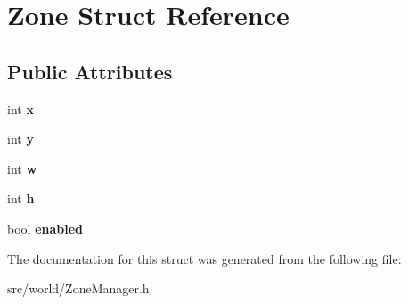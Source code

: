 \hypertarget{structZone}{\section{Zone Struct Reference}
\label{structZone}
}
\subsection*{Public Attributes}
\begin{DoxyCompactItemize}
\item 
\hypertarget{structZone_a439327647492fa561be6d47ab3d40bec}{int {\bfseries x}}\label{structZone_a439327647492fa561be6d47ab3d40bec}

\item 
\hypertarget{structZone_a1a0acf355558e1188d459e66bd6e317d}{int {\bfseries y}}\label{structZone_a1a0acf355558e1188d459e66bd6e317d}

\item 
\hypertarget{structZone_a0cbeccc4a1342d8d3c7ea1bb76fbdc7a}{int {\bfseries w}}\label{structZone_a0cbeccc4a1342d8d3c7ea1bb76fbdc7a}

\item 
\hypertarget{structZone_a73278f3e8442ac43ef17fbe4bf883c9f}{int {\bfseries h}}\label{structZone_a73278f3e8442ac43ef17fbe4bf883c9f}

\item 
\hypertarget{structZone_adc6e5df23ca113dc0a8dc879d2587e1a}{bool {\bfseries enabled}}\label{structZone_adc6e5df23ca113dc0a8dc879d2587e1a}

\end{DoxyCompactItemize}


The documentation for this struct was generated from the following file\-:\begin{DoxyCompactItemize}
\item 
src/world/Zone\-Manager.\-h\end{DoxyCompactItemize}
